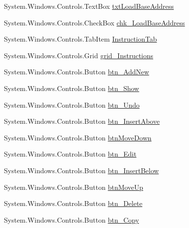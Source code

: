 \begin{DoxyCompactItemize}
System.\+Windows.\+Controls.\+Text\+Box \hyperlink{class_c_p_u___o_s___simulator_1_1_main_window_ae6c0ce6078d081b2cb99518c68f1cd85}{txt\+Load\+Base\+Address}
\item 
System.\+Windows.\+Controls.\+Check\+Box \hyperlink{class_c_p_u___o_s___simulator_1_1_main_window_a8ade8cf3e5e2ec2374c984dac406b5e9}{chk\+\_\+\+Load\+Base\+Address}
\item 
System.\+Windows.\+Controls.\+Tab\+Item \hyperlink{class_c_p_u___o_s___simulator_1_1_main_window_a4fe9f6d97eb1f2c45b9e5a0363e61557}{Instruction\+Tab}
\item 
System.\+Windows.\+Controls.\+Grid \hyperlink{class_c_p_u___o_s___simulator_1_1_main_window_af09ff1f305e936227c4a975f4c788133}{grid\+\_\+\+Instructions}
\item 
System.\+Windows.\+Controls.\+Button \hyperlink{class_c_p_u___o_s___simulator_1_1_main_window_a50fb8fcd9e592c4987fac4bcb8762785}{btn\+\_\+\+Add\+New}
\item 
System.\+Windows.\+Controls.\+Button \hyperlink{class_c_p_u___o_s___simulator_1_1_main_window_a3c6c4760a8fd64f653fff0ad06374f13}{btn\+\_\+\+Show}
\item 
System.\+Windows.\+Controls.\+Button \hyperlink{class_c_p_u___o_s___simulator_1_1_main_window_ac30720a1b345a3d59312d2d68f742359}{btn\+\_\+\+Undo}
\item 
System.\+Windows.\+Controls.\+Button \hyperlink{class_c_p_u___o_s___simulator_1_1_main_window_a23c681375b103d2294ac79c51f1fb406}{btn\+\_\+\+Insert\+Above}
\item 
System.\+Windows.\+Controls.\+Button \hyperlink{class_c_p_u___o_s___simulator_1_1_main_window_ac6bfabebf21c92a905764305b789df46}{btn\+Move\+Down}
\item 
System.\+Windows.\+Controls.\+Button \hyperlink{class_c_p_u___o_s___simulator_1_1_main_window_ae07013ea273fb1e9f38fd1dd83144371}{btn\+\_\+\+Edit}
\item 
System.\+Windows.\+Controls.\+Button \hyperlink{class_c_p_u___o_s___simulator_1_1_main_window_a7c6c417d0bd3af11e77f86cf2cfb03fe}{btn\+\_\+\+Insert\+Below}
\item 
System.\+Windows.\+Controls.\+Button \hyperlink{class_c_p_u___o_s___simulator_1_1_main_window_aa85d9301fed773f44a352aad64a9d80d}{btn\+Move\+Up}
\item 
System.\+Windows.\+Controls.\+Button \hyperlink{class_c_p_u___o_s___simulator_1_1_main_window_a74623b1e8f8ab1b3b6835bda2e8a9256}{btn\+\_\+\+Delete}
\item 
System.\+Windows.\+Controls.\+Button \hyperlink{class_c_p_u___o_s___simulator_1_1_main_window_a55b2516a7b78d0e79deac7f1a79f3a92}{btn\+\_\+\+Copy}

\end{DoxyCompactItemize}
